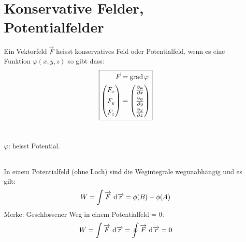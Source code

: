 \section{Konservative Felder, Potentialfelder}
Ein Vektorfeld $\vec{F}$ heisst konservatives Feld oder Potentialfeld, wenn es eine Funktion $\varphi(x,y,z)$ so gibt dass:
\[\boxed{
	\renewcommand{\arraystretch}{1.4}
	\begin{aligned}	
	\vec{F} &= \grad \varphi \\
	\left( \begin{matrix}
		F_x \\
		F_y \\
		F_z \\
	\end{matrix} \right) &=
	\left(\begin{matrix}
		\pdifrac{\varphi}{x} \\
		\pdifrac{\varphi}{y} \\
		\pdifrac{\varphi}{z}
	\end{matrix}\right)
\end{aligned}}\]
\\
\begin{footnotesize}
	$\varphi$: heisst Potential.\\
\end{footnotesize}
\\
In einem Potentialfeld (ohne Loch) sind die Wegintegrale wegunabhängig und es gilt:
\[
	W=\int \overrightarrow{F} \ \di \overrightarrow{r}= \phi(B)-\phi(A)
\]
Merke: Geschlossener Weg in einem Potentialfeld = 0:
\[
	W=\int \overrightarrow{F} \ \di \overrightarrow{r}= \oint  \overrightarrow{F} \ \di \overrightarrow{r}=0
\]
\\
